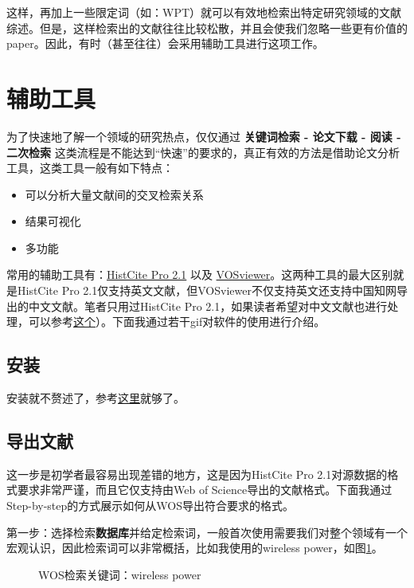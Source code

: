 \documentclass[UTF8]{ctexbook}
\begin{document}
这样，再加上一些限定词（如：WPT）就可以有效地检索出特定研究领域的文献综述。但是，这样检索出的文献往往比较松散，并且会使我们忽略一些更有价值的paper。因此，有时（甚至往往）会采用辅助工具进行这项工作。

\section{辅助工具}
为了快速地了解一个领域的研究热点，仅仅通过 {\bf 关键词检索 - 论文下载 - 阅读 - 二次检索} 这类流程是不能达到“快速”的要求的，真正有效的方法是借助论文分析工具，这类工具一般有如下特点：

\begin{itemize}
	\item 可以分析大量文献间的交叉检索关系
	\item 结果可视化
	\item 多功能
\end{itemize}

常用的辅助工具有：\href{https://zhuanlan.zhihu.com/p/20902898}{HistCite Pro 2.1} 以及 \href{https://zhuanlan.zhihu.com/p/30970993}{VOSviewer}。这两种工具的最大区别就是HistCite Pro 2.1仅支持英文文献，但VOSviewer不仅支持英文还支持中国知网导出的中文文献。笔者只用过HistCite Pro 2.1，如果读者希望对中文文献也进行处理，可以参考\href{https://www.jianshu.com/p/e20f3f1d17d8}{这个}）。下面我通过若干gif对软件的使用进行介绍。
\subsection{安装}
安装就不赘述了，参考\href{https://zhuanlan.zhihu.com/p/20902898}{这里}就够了。
\subsection{导出文献}
这一步是初学者最容易出现差错的地方，这是因为HistCite Pro 2.1对源数据的格式要求非常严谨，而且它仅支持由Web of Science导出的文献格式。下面我通过Step-by-step的方式展示如何从WOS导出符合要求的格式。

第一步：选择检索{\bf 数据库}并给定检索词，一般首次使用需要我们对整个领域有一个宏观认识，因此检索词可以非常概括，比如我使用的wireless power，如图\ref{fig:1}。

\begin{figure}[!htb]
	\centering
	\vspace{-0.3cm}
	\caption{WOS检索关键词：wireless power}\label{fig:1}
\end{figure}
\end{document}
